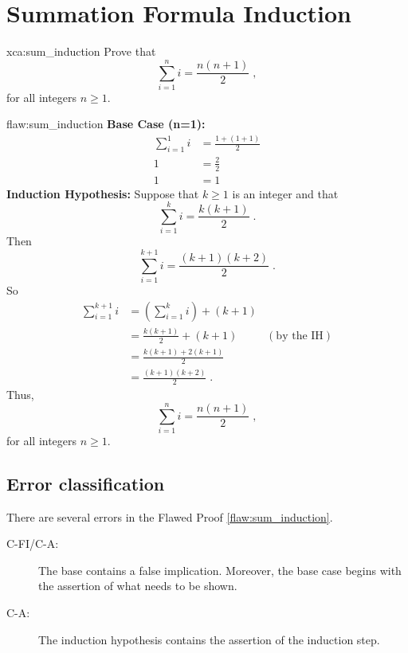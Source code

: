 \section{Summation Formula Induction}

\begin{xca}{xca:sum_induction}
Prove that
$$\sum_{i=1}^n i = \frac{n(n+1)}{2}\;,$$
 for all integers $n \geq 1.$
\end{xca}


\begin{flaw}{flaw:sum_induction} 
\textbf{Base Case (n=1):} 
\begin{align*}
    \sum_{i=1}^1 i & = \frac{1+(1+1)}{2} \\
    1 &= \frac{2}{2} \\
    1 &= 1
\end{align*}
\textbf{Induction Hypothesis:} Suppose that $k \geq 1$ is an integer and that 
$$\sum_{i=1}^k i = \frac{k(k+1)}{2}\;.$$ Then
$$\sum_{i=1}^{k+1} i = \frac{(k+1)(k+2)}{2}\;.$$
So
\begin{align*}
    \sum_{i=1}^{k+1} i &= \left(\sum_{i=1}^k i\right) + (k+1) \\
    &= \frac{k(k+1)}{2} + (k+1) & (\text{by the IH})\\
    &= \frac{k(k+1) + 2(k+1)}{2} \\
    &= \frac{(k+1)(k+2)}{2}\;.
\end{align*}
Thus, 
$$\sum_{i=1}^n i = \frac{n(n+1)}{2}\;,$$
 for all integers $n \geq 1.$
\end{flaw}

\clearpage
\subsection{Error classification}


There are several errors
 in the Flawed Proof \ref{flaw:sum_induction}. 

 
 \begin{description}
 	\item[C-FI/C-A:] The base contains a false implication.  Moreover, the base case begins with the assertion of what needs to be shown.
 	\item[C-A:] The induction hypothesis contains the assertion of the induction step.
 \end{description}

